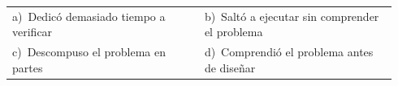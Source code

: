 \documentclass[11pt,a4paper]{article}
\begin{document}
\begin{enumerate}[label=\textbf{\arabic*.},leftmargin=*,itemsep=6pt,topsep=0pt]
\begin{minipage}[t]{\linewidth}
\vspace{4pt}
\begin{tabular}{@{}>{\raggedright\arraybackslash}p{0.47\linewidth}>{\raggedright\arraybackslash}p{0.47\linewidth}@{}}
a)~Dedicó demasiado tiempo a verificar & b)~Saltó a ejecutar sin comprender el problema \\
c)~Descompuso el problema en partes & d)~Comprendió el problema antes de diseñar \\
\end{tabular}
\end{minipage}

\end{enumerate}
\end{document}
